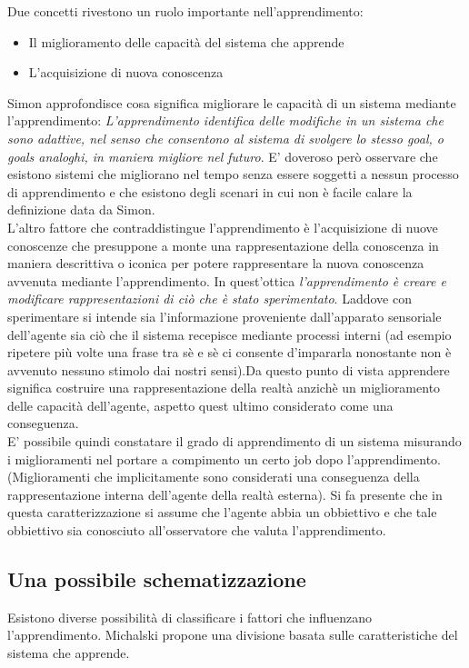 Due concetti rivestono un ruolo importante nell'apprendimento: 
\begin{itemize}
\item Il miglioramento delle capacità del sistema che apprende
\item L'acquisizione di nuova conoscenza
\end{itemize}
Simon \cite{Sim83} approfondisce cosa significa migliorare le capacità di un sistema mediante l'apprendimento: \textit {L'apprendimento identifica delle modifiche in un sistema che sono adattive, nel senso che consentono al sistema di svolgere lo stesso goal, o goals analoghi, in maniera migliore nel futuro}. E' doveroso però osservare  che esistono sistemi che migliorano nel tempo senza essere soggetti a nessun processo di apprendimento e che esistono degli scenari in cui non è facile calare la definizione data da Simon.\\

L'altro fattore che contraddistingue l'apprendimento è l'acquisizione di nuove conoscenze che presuppone a monte una rappresentazione della conoscenza in maniera descrittiva o iconica per potere rappresentare la nuova conoscenza avvenuta mediante l'apprendimento.  In quest'ottica \emph{l'apprendimento è creare e modificare rappresentazioni di ciò che è stato sperimentato}. Laddove con sperimentare si intende sia l'informazione proveniente dall'apparato sensoriale dell'agente sia ciò che il sistema recepisce mediante processi interni (ad esempio ripetere più volte una frase tra sè e sè ci consente d'impararla nonostante non è avvenuto nessuno stimolo dai nostri sensi).Da questo punto di vista apprendere significa costruire una rappresentazione della realtà anzichè un miglioramento delle capacità dell'agente, aspetto quest ultimo considerato come una conseguenza.\\

E' possibile quindi constatare il grado di apprendimento di un sistema misurando i miglioramenti nel portare a compimento un certo job dopo l'apprendimento. (Miglioramenti che implicitamente sono considerati una conseguenza della rappresentazione interna dell'agente della realtà esterna). Si fa presente che in questa caratterizzazione si assume che l'agente abbia un obbiettivo e che tale obbiettivo sia conosciuto all'osservatore che valuta l'apprendimento. 
\subsection{Una possibile schematizzazione}
\label{sub:tipiapp}
Esistono diverse possibilità di classificare i fattori che influenzano l’apprendimento. Michalski \cite{Mic86b} propone una divisione  basata sulle
caratteristiche del sistema che apprende.

